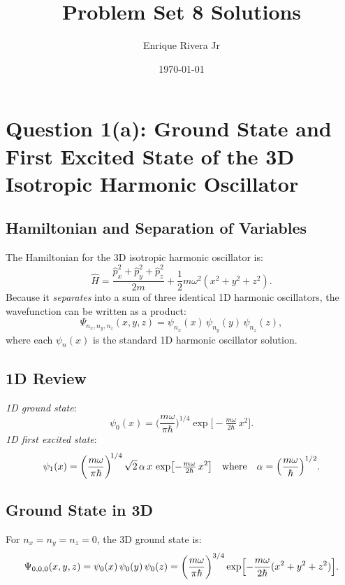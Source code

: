 \documentclass[12pt]{article}
\begin{document}
\title{Problem Set 8 Solutions}
\author{Enrique Rivera Jr}
\date{\today}

\maketitle





\section*{Question 1(a): Ground State and First Excited State of the 3D Isotropic Harmonic Oscillator}
\subsection*{Hamiltonian and Separation of Variables}
\noindent
The Hamiltonian for the 3D isotropic harmonic oscillator is:
\begin{equation}
\hat{H} = \frac{\hat{p}_x^2 + \hat{p}_y^2 + \hat{p}_z^2}{2m} + \frac{1}{2}m\omega^2 (x^2 + y^2 + z^2).
\end{equation}
Because it \emph{separates} into a sum of three identical 1D harmonic oscillators, the wavefunction can be written as a product:
\begin{equation}
\Psi_{n_x,n_y,n_z}(x,y,z) = \psi_{n_x}(x)\,\psi_{n_y}(y)\,\psi_{n_z}(z),
\end{equation}
where each \(\psi_{n}(x)\) is the standard 1D harmonic oscillator solution.

\subsection*{1D Review}
\noindent\emph{1D ground state}:\quad
\begin{equation}
\psi_{0}(x) = \biggl(\frac{m\omega}{\pi\hbar}\biggr)^{\!1/4}\exp\bigl[-\tfrac{m\omega}{2\hbar}\,x^2\bigr].
\end{equation}
\noindent\emph{1D first excited state}:\quad
\begin{equation}
\psi_{1}(x) = \biggl(\frac{m\omega}{\pi\hbar}\biggr)^{\!1/4}\,\sqrt{2}\,\alpha\,x\,\exp\bigl[-\tfrac{m\omega}{2\hbar}\,x^2\bigr]\quad\text{where}\quad\alpha = \Bigl(\frac{m\omega}{\hbar}\Bigr)^{1/2}.
\end{equation}

\subsection*{Ground State in 3D}
\noindent
For \(n_x=n_y=n_z=0\), the 3D ground state is:
\begin{equation}
\Psi_{0,0,0}(x,y,z) = \psi_0(x)\,\psi_0(y)\,\psi_0(z)
= \biggl(\frac{m\omega}{\pi\hbar}\biggr)^{3/4}\exp\Bigl[-\frac{m\omega}{2\hbar}(x^2 + y^2 + z^2)\Bigr].
\end{equation}
\end{document}
